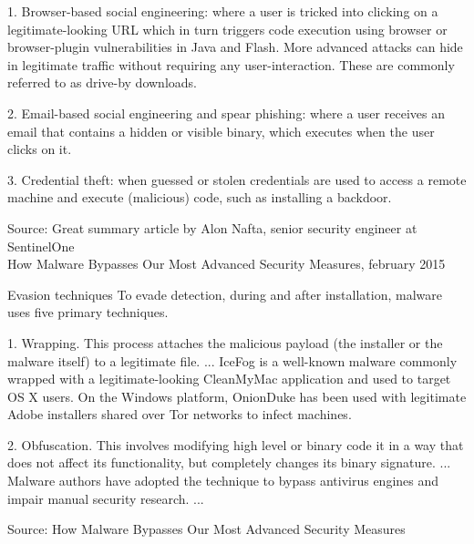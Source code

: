 \documentclass[20pt,landscape,a4paper,footrule]{foils}
\begin{document}
\begin{list2}
\item 1. Browser-based social engineering: where a user is tricked into clicking on a legitimate-looking URL which in turn triggers code execution using browser or browser-plugin vulnerabilities in Java and Flash. More advanced attacks can hide in legitimate traffic without requiring any user-interaction. These are commonly referred to as drive-by downloads.
\item 2. Email-based social engineering and spear phishing: where a user receives an email that contains a hidden or visible binary, which executes when the user clicks on it.
\item 3. Credential theft: when guessed or stolen credentials are used to access a remote machine and execute (malicious) code, such as installing a backdoor.
\end{list2}

{\small Source: Great summary article by Alon Nafta, senior security engineer at SentinelOne\\
How Malware Bypasses Our Most Advanced Security Measures, february 2015}\\
{\tiny{}}




Evasion techniques
To evade detection, during and after installation, malware uses five primary techniques.
\begin{list1}
\item 1. Wrapping. This process attaches the malicious payload (the installer or the malware itself) to a legitimate file. 
... IceFog is a well-known malware commonly wrapped with a legitimate-looking CleanMyMac application and used to target OS X users. On the Windows platform, OnionDuke has been used with legitimate Adobe installers shared over Tor networks to infect machines.
\item 2. Obfuscation. This involves modifying high level or binary code it in a way that does not affect its functionality, but completely changes its binary signature. ... Malware authors have adopted the technique to bypass antivirus engines and impair manual security research. ...
\end{list1}

Source: How Malware Bypasses Our Most Advanced Security Measures\\
{\tiny{}}
\end{document}
